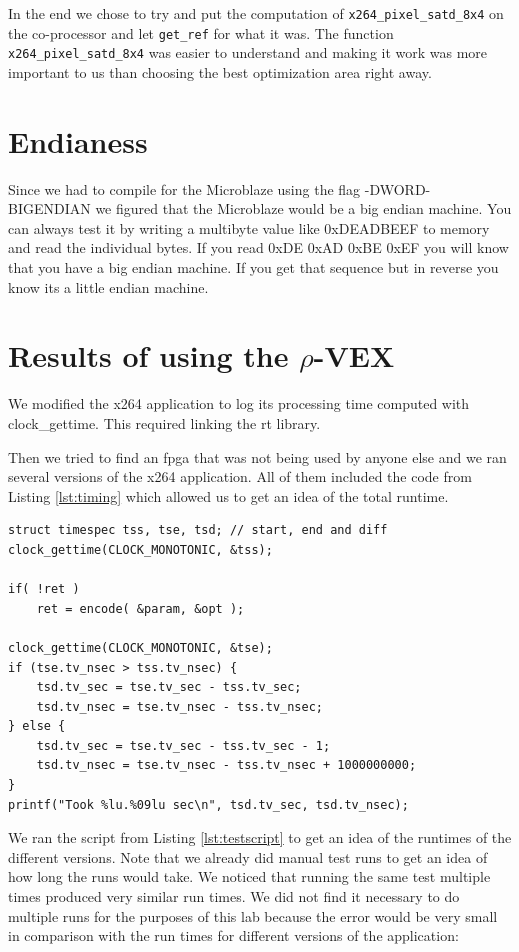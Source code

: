 \documentclass{article}
\newcommand{\rvex}{\ensuremath{\rho}-VEX}
\newcommand{\satd}{\texttt{x264\_pixel\_satd\_8x4}}
\newcommand{\getref}{\texttt{get\_ref}}
\begin{document}
In the end we chose to try and put the computation of \satd{} on the
co-processor and let \getref{} for what it was. 
The function \satd{} was easier
to understand and making it work was more important to us than choosing the
best optimization area right away.

\section{Endianess}

Since we had to compile for the Microblaze using the flag -DWORD-BIGENDIAN we
figured that the Microblaze would be a big endian machine. 
You can always test
it by writing a multibyte value like 0xDEADBEEF to memory and read the
individual bytes. 
If you read 0xDE 0xAD 0xBE 0xEF you will know that you have a
big endian machine. 
If you get that sequence but in reverse you know its a
little endian machine.

\section{Results of using the \rvex{}}

We modified the x264 application to log its processing time computed with
clock\_gettime. 
This required linking the rt library.

Then we tried to find an fpga that was not being used by anyone else and we ran
several versions of the x264 application. 
All of them included the code from Listing \ref{lst:timing} which allowed us to get an idea of the total runtime. 

\begin{lstlisting}[style=C,caption=Capturing runtime with the monotonic clock,label=lst:timing]
struct timespec tss, tse, tsd; // start, end and diff
clock_gettime(CLOCK_MONOTONIC, &tss);

if( !ret )
    ret = encode( &param, &opt );

clock_gettime(CLOCK_MONOTONIC, &tse);
if (tse.tv_nsec > tss.tv_nsec) {
    tsd.tv_sec = tse.tv_sec - tss.tv_sec;
    tsd.tv_nsec = tse.tv_nsec - tss.tv_nsec;
} else {
    tsd.tv_sec = tse.tv_sec - tss.tv_sec - 1;
    tsd.tv_nsec = tse.tv_nsec - tss.tv_nsec + 1000000000;
}
printf("Took %lu.%09lu sec\n", tsd.tv_sec, tsd.tv_nsec);
\end{lstlisting}

We ran the script from Listing \ref{lst:testscript} to get an idea of the runtimes of the different versions. 
Note that we already did manual test runs to get an idea of how long the runs would take. 
We noticed that running the same test multiple times produced very similar run times. 
We did not find it necessary to do multiple runs for the purposes of this lab because the error would be very small in comparison with the run times for different versions of the application:
\end{document}
